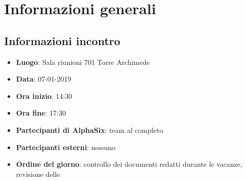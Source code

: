 \newcommand{\documento}{\VI}
\newcommand{\nomedocumentofisico}{VI\ 07-01-2018.pdf}
\newcommand{\redazione}{\SG}
\newcommand{\verifica}{\LC}
\newcommand{\approvazione}{\NC}
\newcommand{\versione}{1.0.0}
\newcommand{\uso}{Interno}
\newcommand{\destinateTo}{\TV, \\ & \RC, \\ & \II}
\newcommand{\datacreazione}{08 gennaio 2019}
\newcommand{\datamodifica}{09 gennaio 2019}
\newcommand{\stato}{Approvato}

\def\TABELLE{false}	%
\def\FIGURE{false} 	%






    

    	
    
    \section{Informazioni generali}
		\subsection{Informazioni incontro}
			\begin{itemize}
				\item { \textbf{Luogo}: Sala riunioni 701 Torre Archimede}
				\item { \textbf{Data}: 07-01-2019}
				\item { \textbf{Ora inizio}: 14:30}
				\item { \textbf{Ora fine}: 17:30}
				\item { \textbf{Partecipanti di AlphaSix}: team al completo}
				\item { \textbf{Partecipanti esterni}: nessuno}
				\item { \textbf{Ordine del giorno}: controllo dei documenti redatti durante le vacanze, revisione delle \NdP}
			\end{itemize}

